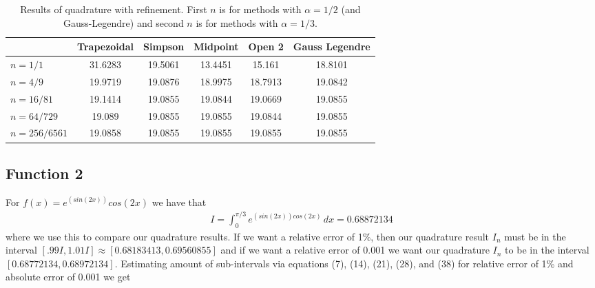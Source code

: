 \documentclass[12pt]{article}
\theoremstyle{remark}
\begin{document}
\begin{table}[H]
	\centering
	\begin{tabular}{||l|c|c|c|c|c||}
		\cline{2-6}
		\multicolumn{1}{c|}{} & Trapezoidal & Simpson & Midpoint & Open 2 & Gauss Legendre \\ \hline \hline
		$n=1/1$ & 31.6283 & 19.5061 & 13.4451 & 15.161 & 18.8101 \\ \hline
		$n=4/9$ & 19.9719 & 19.0876 & 18.9975 & 18.7913 & 19.0842 \\ \hline
		$n=16/81$ & 19.1414 & 19.0855 & 19.0844 & 19.0669 & 19.0855 \\ \hline
		$n=64/729$ & 19.089 & 19.0855 & 19.0855 & 19.0844 & 19.0855 \\ \hline
		$n=256/6561$ & 19.0858 & 19.0855 & 19.0855 & 19.0855 & 19.0855 \\ \hline
	\end{tabular}
	\caption{Results of quadrature with refinement. First $n$ is for methods with $\alpha = 1/2$ (and Gauss-Legendre) and second $n$ is for methods with $\alpha = 1/3$.}
\end{table}

\newpage

\subsection{Function 2}

For $f(x) = e^{(sin(2x))}cos(2x)$ we have that
\begin{align} 
I = \int_0^{\pi/3} e^{(sin(2x))cos(2x)} \, dx = 0.68872134
\end{align}
where we use this to compare our quadrature results. If we want a relative error of 1\%, then our quadrature result $I_n$ must be in the interval $[.99I, 1.01I] \approx [0.68183413, 0.69560855]$ and if we want a relative error of 0.001 we want our quadrature $I_n$ to be in the interval $[0.68772134,0.68972134]$. Estimating amount of sub-intervals via equations (7), (14), (21), (28), and (38) for relative error of 1\% and absolute error of 0.001 we get
\end{document}
